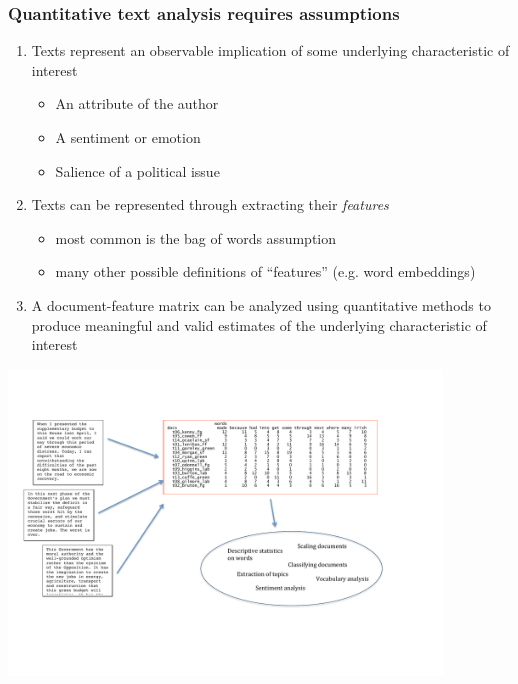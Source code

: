 \documentclass[notes=hide]{beamer}
\begin{document}
\begin{frame}
	\frametitle{Quantitative text analysis requires assumptions}
	\begin{enumerate}[<+->]
		\setlength{\itemsep}{1ex}
		\item Texts represent an observable implication of some
		underlying characteristic of interest
		\begin{itemize}
			\item An attribute of the author
			\item A sentiment or emotion
			\item Salience of a political issue
		\end{itemize}
		\item Texts can be represented through extracting their
		\emph{features}
		\begin{itemize}
			\item most common is the \alert{bag of words} assumption
			\item many other possible definitions of ``features'' (e.g. word embeddings)
		\end{itemize}
		\item A \alert{document-feature matrix} can be analyzed using
		quantitative methods to produce meaningful and valid estimates of
		the underlying characteristic of interest
	\end{enumerate}
\end{frame}

\begin{frame}
	\includegraphics[width=11.5cm]{figures/workflow.pdf}
\end{frame}
\end{document}
